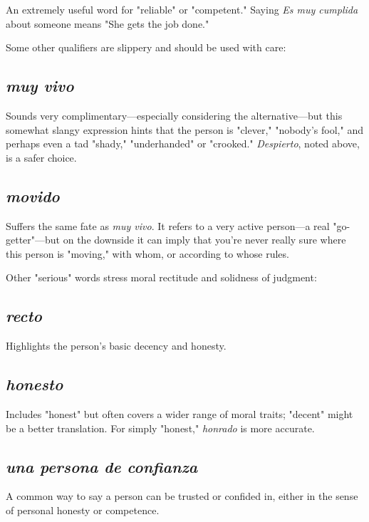 \documentclass[14pt,a4paper,oneside]{memoir}
\newcommand{\bsk}{\vspace{20pt}}
\begin{document}
An extremely useful word for "reliable" or "competent." Saying \emph{Es muy cumplida} about someone means "She gets the job done."

\bsk

Some other qualifiers are slippery and should be used with care:

\subsection{\emph{muy vivo}}

Sounds very complimentary---especially considering the alternative---but this somewhat slangy expression hints that
the person is "clever," "nobody's fool," and perhaps even a tad "shady,"
"underhanded" or "crooked." \emph{Despierto}, noted above, is a safer choice.

\subsection{\emph{movido}}

Suffers the same fate as \emph{muy vivo}. It refers to a very
active person---a real "go-getter"---but on the downside it can imply
that you're never really sure where this person is "moving," with
whom, or according to whose rules.

\bsk

Other "serious" words stress moral rectitude and solidness of
judgment:

\subsection{\emph{recto}}

Highlights the person's basic decency and honesty.

\subsection{\emph{honesto}}

Includes "honest" but often covers a wider range
of moral traits; "decent" might be a better translation. For simply
"honest," \emph{honrado} is more accurate.

\subsection{\emph{una persona de confianza}}

A common way to say a person can be trusted or confided in, either in the sense of personal honesty or competence.
\end{document}
